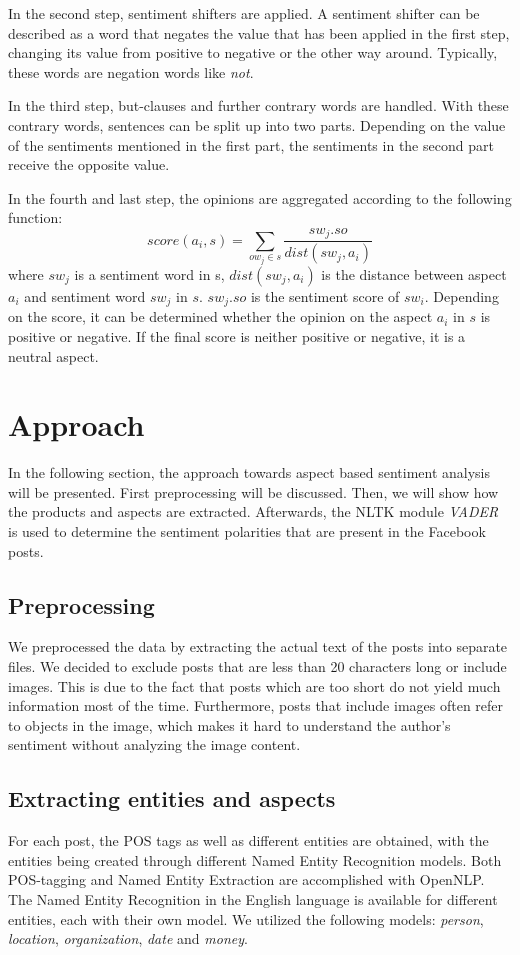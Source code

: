 \documentclass[10pt,a4paper]{article}
\begin{document}
		In the second step, sentiment shifters are applied. A sentiment shifter can be described as a word that negates the value that has been applied in the first step, changing its value from positive to negative or the other way around. Typically, these words are negation words like \textit{not}. 
		
		In the third step, but-clauses and further contrary words are handled. With these contrary words, sentences can be split up into two parts. Depending on the value of the sentiments mentioned in the first part, the sentiments in the second part receive the opposite value.
		
		In the fourth and last step, the opinions are aggregated according to the following function:
		\begin{displaymath}
			score(a_i,s) = \sum_{ow_j \in s} \frac{sw_j.so}{dist(sw_j,a_i)}
		\end{displaymath}
		where $sw_j$ is a sentiment word in s, $dist(sw_j, a_i)$ is the distance between aspect $a_i$ and sentiment word $sw_j$ in $s$. $sw_j.so$ is the sentiment score of $sw_i$. Depending on the score, it can be determined whether the opinion on the aspect $a_i$ in $s$ is positive or negative. If the final score is neither positive or negative, it is a neutral aspect.
	
	\section{Approach}
	In the following section, the approach towards aspect based sentiment analysis will be presented. First preprocessing will be discussed. Then, we will show how the products and aspects are extracted. Afterwards, the NLTK module \textit{VADER} is used to determine the sentiment polarities that are present in the Facebook posts.
			
		\subsection{Preprocessing}
		We preprocessed the data by extracting the actual text of the posts into separate files. We decided to exclude posts that are less than 20 characters long or include images. This is due to the fact that posts which are too short do not yield much information most of the time. Furthermore, posts that include images often refer to objects in the image, which makes it hard to understand the author's sentiment without analyzing the image content.
			
		\subsection{Extracting entities and aspects}
		\label{sec:entityextraction}
		For each post, the POS tags as well as different entities are obtained, with the entities being created through different Named Entity Recognition models. Both POS-tagging and Named Entity Extraction are accomplished with OpenNLP. The Named Entity Recognition in the English language is available for different entities, each with their own model. We utilized the following models: \textit{person}, \textit{location}, \textit{organization}, \textit{date} and \textit{money}.
		
\end{document}

